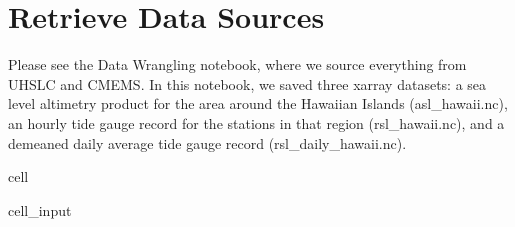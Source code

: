 \documentclass[letterpaper,10pt,english]{jupyterBook}
\begin{document}
\chapter{Retrieve Data Sources}
\label{\detokenize{notebooks/regional_and_local/SL_Trend:retrieve-data-sources}}
\sphinxAtStartPar
Please see the Data Wrangling notebook, where we source everything from UHSLC and CMEMS. In this notebook, we saved three xarray datasets: a sea level altimetry product for the area around the Hawaiian Islands (asl\_hawaii.nc), an hourly tide gauge record for the stations in that region (rsl\_hawaii.nc), and a de\sphinxhyphen{}meaned daily average tide gauge record (rsl\_daily\_hawaii.nc).

\begin{sphinxuseclass}{cell}\begin{sphinxVerbatimInput}

\begin{sphinxuseclass}{cell_input}
\begin{sphinxVerbatim}[commandchars=\\\{\}]
  
  

    
  
  


\end{sphinxVerbatim}
\end{sphinxuseclass}
\end{sphinxVerbatimInput}
\end{sphinxuseclass}
\end{document}

